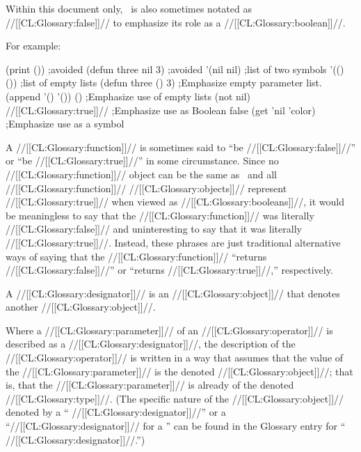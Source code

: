 
Within this document only, \nil\ is also sometimes notated as //[[CL:Glossary:false]]// to
emphasize its role as a //[[CL:Glossary:boolean]]//.

For example:

\code
 (print ())                          ;avoided
 (defun three nil 3)                 ;avoided 
 '(nil nil)                          ;list of two symbols
 '(() ())                            ;list of empty lists
 (defun three () 3)                  ;Emphasize empty parameter list.
 (append '() '()) \EV ()              ;Emphasize use of empty lists
 (not nil) \EV //[[CL:Glossary:true]]//                   ;Emphasize use as Boolean false
 (get 'nil 'color)                   ;Emphasize use as a symbol
\endcode

A //[[CL:Glossary:function]]// is sometimes said to ``be //[[CL:Glossary:false]]//'' or ``be //[[CL:Glossary:true]]//''
in some circumstance.
Since no //[[CL:Glossary:function]]// object can be the same as \nil\ 
and all //[[CL:Glossary:function]]// //[[CL:Glossary:objects]]// represent //[[CL:Glossary:true]]// when viewed as //[[CL:Glossary:booleans]]//,
it would be meaningless to say that the //[[CL:Glossary:function]]// was literally //[[CL:Glossary:false]]// 
and uninteresting to say that it was literally //[[CL:Glossary:true]]//.
Instead, these phrases are just traditional alternative ways of saying that the
//[[CL:Glossary:function]]// ``returns //[[CL:Glossary:false]]//'' or ``returns //[[CL:Glossary:true]]//,'' respectively.

\endsubsubsubsection%

\endsubsubsection%



A //[[CL:Glossary:designator]]// is an //[[CL:Glossary:object]]// that denotes another //[[CL:Glossary:object]]//.


Where a //[[CL:Glossary:parameter]]// of an //[[CL:Glossary:operator]]// is described as a //[[CL:Glossary:designator]]//,
the description of the //[[CL:Glossary:operator]]// is written in a way that assumes that
the value of the //[[CL:Glossary:parameter]]// is the denoted //[[CL:Glossary:object]]//;
that is, that the //[[CL:Glossary:parameter]]// is already of the denoted //[[CL:Glossary:type]]//.
(The specific nature of the //[[CL:Glossary:object]]// denoted by
   a `` //[[CL:Glossary:designator]]//''
or a ``//[[CL:Glossary:designator]]// for a '' 
can be found in the Glossary entry for ``\metavar{type} //[[CL:Glossary:designator]]//.'')


